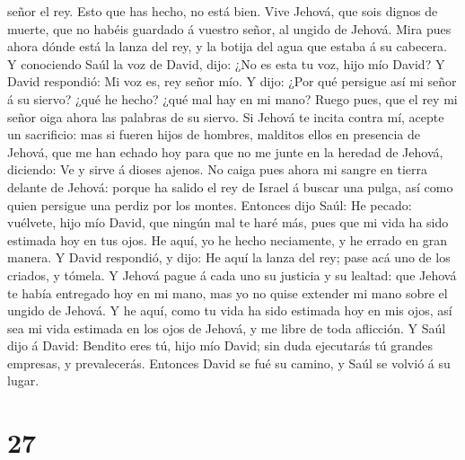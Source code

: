 señor el rey.  Esto que has hecho, no está bien. Vive
Jehová, que sois dignos de muerte, que no habéis guardado á vuestro
señor, al ungido de Jehová. Mira pues ahora dónde está la lanza del rey,
y la botija del agua que estaba á su cabecera.  Y
conociendo Saúl la voz de David, dijo: ¿No es esta tu voz, hijo mío
David? Y David respondió: Mi voz es, rey señor mío.  Y
dijo: ¿Por qué persigue así mi señor á su siervo? ¿qué he hecho? ¿qué
mal hay en mi mano?  Ruego pues, que el rey mi señor oiga
ahora las palabras de su siervo. Si Jehová te incita contra mí, acepte
un sacrificio: mas si fueren hijos de hombres, malditos ellos en
presencia de Jehová, que me han echado hoy para que no me junte en la
heredad de Jehová, diciendo: Ve y sirve á dioses ajenos. 
No caiga pues ahora mi sangre en tierra delante de Jehová: porque ha
salido el rey de Israel á buscar una pulga, así como quien persigue una
perdiz por los montes.  Entonces dijo Saúl: He pecado:
vuélvete, hijo mío David, que ningún mal te haré más, pues que mi vida
ha sido estimada hoy en tus ojos. He aquí, yo he hecho neciamente, y he
errado en gran manera.  Y David respondió, y dijo: He aquí
la lanza del rey; pase acá uno de los criados, y tómela.  Y
Jehová pague á cada uno su justicia y su lealtad: que Jehová te había
entregado hoy en mi mano, mas yo no quise extender mi mano sobre el
ungido de Jehová.  Y he aquí, como tu vida ha sido estimada
hoy en mis ojos, así sea mi vida estimada en los ojos de Jehová, y me
libre de toda aflicción.  Y Saúl dijo á David: Bendito eres
tú, hijo mío David; sin duda ejecutarás tú grandes empresas, y
prevalecerás. Entonces David se fué su camino, y Saúl se volvió á su
lugar.

\hypertarget{section-26}{%
\section{27}\label{section-26}}

